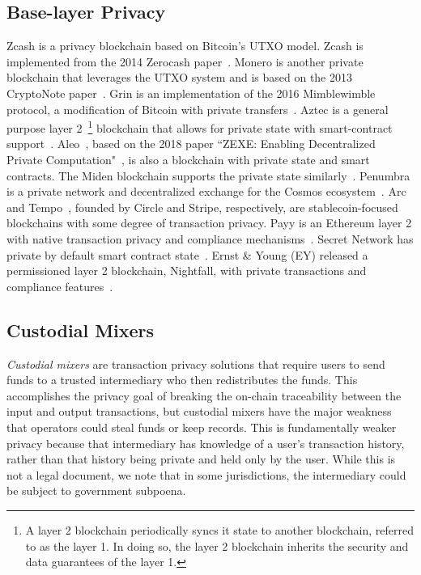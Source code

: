 \documentclass[9pt]{extreport}
\begin{document}
\subsection{Base-layer Privacy}
Zcash is a privacy blockchain based on Bitcoin's UTXO model.  Zcash is implemented from the 2014 Zerocash paper~\cite{ZcashWhitepaper}.  Monero is another private blockchain that leverages the UTXO system and is based on the 2013 CryptoNote paper~\cite{cryptonote}.  Grin is an implementation of the 2016 Mimblewimble protocol, a modification of Bitcoin with private transfers~\cite{jedusor2016mimblewimble}.  Aztec is a general purpose layer 2~\footnote{A layer 2 blockchain periodically syncs it state to another blockchain, referred to as the layer 1.  In doing so, the layer 2 blockchain inherits the security and data guarantees of the layer 1.} blockchain that allows for private state with smart-contract support~\cite{aztecprotocol}.  Aleo~\cite{aleo2025homepage}, based on the 2018 paper ``ZEXE: Enabling Decentralized Private Computation"~\cite{ZEXE}, is also a blockchain with private state and smart contracts.  The Miden blockchain supports the private state similarly~\cite{miden2024web}.  Penumbra is a private network and decentralized exchange for the Cosmos ecosystem~\cite{penumbraprotocol}.  Arc~\cite{circlearc} and Tempo~\cite{tempo2025}, founded by Circle and Stripe, respectively, are stablecoin-focused blockchains with some degree of transaction privacy.  Payy is an Ethereum layer 2 with native transaction privacy and compliance mechanisms~\cite{payywhitepaper}.  Secret Network has private by default smart contract state~\cite{secretnetwork2025docs}.  Ernst \& Young (EY) released a permissioned layer 2 blockchain, Nightfall, with private transactions and compliance features~\cite{ey2025blockchain}.

\subsection{Custodial Mixers}
\textit{Custodial mixers} are transaction privacy solutions that require users to send funds to a trusted intermediary who then redistributes the funds.  This accomplishes the privacy goal of breaking the on-chain traceability between the input and output transactions, but custodial mixers have the major weakness that operators could steal funds or keep records.  This is fundamentally weaker privacy because that intermediary has knowledge of a user's transaction history, rather than that history being private and held only by the user.  While this is not a legal document, we note that in some jurisdictions, the intermediary could be subject to government subpoena.  
\end{document}
